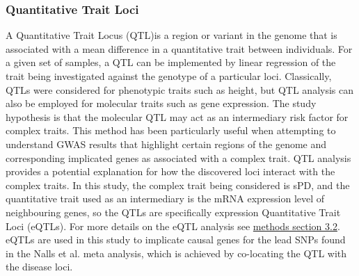\documentclass{article}
\begin{document}
\subsubsection{Quantitative Trait Loci}
\label{subsubsec:QTL}
A Quantitative Trait Locus (QTL)is a region or variant in the genome that is associated with a mean difference in a quantitative trait between individuals. For a given set of samples, a QTL can be implemented by linear regression of the trait being investigated against the genotype of a particular loci\cite{Duffy2017AnalysisLoci}. Classically, QTLs were considered for phenotypic traits such as height, but QTL analysis can also be employed for molecular traits such as gene expression. The study hypothesis is that the molecular QTL may act as an intermediary risk factor for complex traits. This method has been particularly useful when attempting to understand GWAS results that highlight certain regions of the genome and corresponding implicated genes as associated with a complex trait. QTL analysis provides a potential explanation for how the discovered loci interact with the complex traits\cite{Neumeyer2020StrengtheningLoci}. In this study, the complex trait being considered is sPD, and the quantitative trait used as an intermediary is the mRNA expression level of neighbouring genes, so the QTLs are specifically expression Quantitative Trait Loci (eQTLs). For more details on the eQTL analysis see \hyperref[subsec:eQTL]{methods section 3.2}. eQTLs are used in this study to implicate causal genes for the lead SNPs found in the Nalls et al.\cite{Nalls2019IdentificationStudies} meta analysis, which is achieved by co-locating the QTL with the disease loci.
\end{document}
